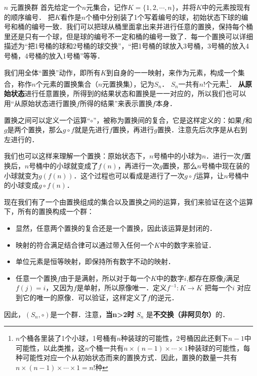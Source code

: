 \begin{example}{$n$ 元置换群}\label{Group_ex3}
首先给定一个$n$元集合，记作$K=\{1,2, \cdots, n\}$，并将$K$中的元素按现有的顺序编号． 把$K$看作是$n$个桶中分别装了1个写着编号的球，初始状态下球的编号和桶的编号一致．我们可以把球从桶里面拿出来并进行任意的置换，保持每个桶里还是只有一个球，但是球的编号不一定和桶的编号一致了．每一个置换可以详细描述为“把1号桶的球和2号桶的球交换”，“把1号桶的球放入3号桶，3号桶的放入4号桶，4号桶的放入1号桶”等等．

我们用全体“置换”动作，即所有$K$到自身的一一映射，来作为元素，构成一个集合，称作$n$个元素的置换集合（$n$元置换集），记为$S_n$． $S_n$一共有$n!$个元素\footnote{$n$个桶各里装了1个小球，1号桶有$n$种装球的可能性，2号桶因此还剩下$n-1$中可能性，以此类推，这$n$个桶一共有$n\times(n-1)\times\cdots\times1$种装球的可能性，每种可能性对应一个从初始状态而来的置换方式．因此，置换的数量一共有$n\times(n-1)\times\cdots\times1=n!$种}． \textbf{从原始状态}进行任意置换，所得到的结果状态和置换是一一对应的，所以我们也可以用“从原始状态进行置换$f$所得的结果”来表示置换$f$本身．

置换之间可以定义一个运算“$\circ$”，被称为置换间的复合，它是这样定义的：如果$f$和$g$是两个置换，那么$g\circ f$就是先进行$f$置换，再进行$g$置换．注意先后次序是从右到左进行的．

我们也可以这样来理解一个置换：原始状态下，$n$号桶中的小球为$n$．进行一次$f$置换后，$n$号桶中的小球就变成了$f(n)$，再进行一次$g$置换，那么$n$号桶中现在装的小球就变为$g(f(n))$．这个过程也可以看成是进行了一次$g\circ f$运算，让$n$号桶中的小球变成$g\circ f(n)$．

现在我们有了一个由置换组成的集合以及置换之间的运算，我们来验证在这个运算下，所有的置换构成一个群：\\
\begin{itemize}
\item 显然，任意两个置换的复合还是一个置换，因此该运算是封闭的．
\item 映射的符合满足结合律可以通过带入任何一个$K$中的数字来验证．
\item 单位元素是恒等映射，即保持所有数字不动的映射．
\item 任意一个置换$f$由于是满射，所以对于每一个$K$中的数字$i$,都存在原像$j$满足$f(j)=i$，又因为$f$是单射，所以原像唯一．定义$f^{-1}:K\rightarrow K$ 把每一个$i$ 对应到它的唯一的原像．可以验证，这样定义了$f$的逆元．
\end{itemize}

因此，$(S_n, \circ)$是一个群．注意，\textbf{当n>2时} $S_n$ 是\textbf{不交换（非阿贝尔）}的．
\end{example}

